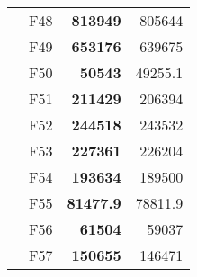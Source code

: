 \begin{table}[]
\begin{tabular}{ll|r|r|}
\multicolumn{1}{|l|}{\cellcolor[HTML]{ECF4FF}}                           & \cellcolor[HTML]{FCE6AB}F48     & \cellcolor[HTML]{D3FFB6}\textbf{813949}                        & 805644                                                    \\ \cline{2-4} 
\multicolumn{1}{|l|}{\cellcolor[HTML]{ECF4FF}}                           & \cellcolor[HTML]{FCE6AB}F49     & \cellcolor[HTML]{D3FFB6}\textbf{653176}                        & 639675                                                    \\ \cline{2-4} 
\multicolumn{1}{|l|}{\cellcolor[HTML]{ECF4FF}}                           & \cellcolor[HTML]{FCE6AB}F50     & \cellcolor[HTML]{D3FFB6}\textbf{50543}                         & 49255.1                                                   \\ \cline{2-4} 
\multicolumn{1}{|l|}{\cellcolor[HTML]{ECF4FF}}                           & \cellcolor[HTML]{FCE6AB}F51     & \cellcolor[HTML]{D3FFB6}\textbf{211429}                        & 206394                                                    \\ \cline{2-4} 
\multicolumn{1}{|l|}{\cellcolor[HTML]{ECF4FF}}                           & \cellcolor[HTML]{FCE6AB}F52     & \cellcolor[HTML]{D3FFB6}\textbf{244518}                        & 243532                                                    \\ \cline{2-4} 
\multicolumn{1}{|l|}{\cellcolor[HTML]{ECF4FF}}                           & \cellcolor[HTML]{FCE6AB}F53     & \cellcolor[HTML]{D3FFB6}\textbf{227361}                        & 226204                                                    \\ \cline{2-4} 
\multicolumn{1}{|l|}{\cellcolor[HTML]{ECF4FF}}                           & \cellcolor[HTML]{FCE6AB}F54     & \cellcolor[HTML]{D3FFB6}\textbf{193634}                        & 189500                                                    \\ \cline{2-4} 
\multicolumn{1}{|l|}{\cellcolor[HTML]{ECF4FF}}                           & \cellcolor[HTML]{FCE6AB}F55     & \cellcolor[HTML]{D3FFB6}\textbf{81477.9}                       & 78811.9                                                   \\ \cline{2-4} 
\multicolumn{1}{|l|}{\cellcolor[HTML]{ECF4FF}}                           & \cellcolor[HTML]{FCE6AB}F56     & \cellcolor[HTML]{D3FFB6}\textbf{61504}                         & 59037                                                     \\ \cline{2-4} 
\multicolumn{1}{|l|}{\cellcolor[HTML]{ECF4FF}}                           & \cellcolor[HTML]{FCE6AB}F57     & \cellcolor[HTML]{D3FFB6}\textbf{150655}                        & 146471                                                    \\ \cline{2-4} 

\end{tabular}
\end{table}
